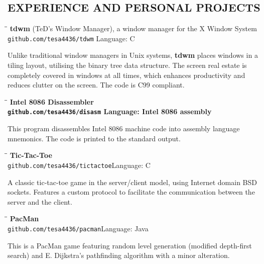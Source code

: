 \documentclass{res}
\begin{document}
\begin{resume}
\section{EXPERIENCE AND PERSONAL PROJECTS}
   \vspace{-0.1in}	
   \begin{tabbing}
   \hspace{2.3in}\= \hspace{2.97in}\= \kill %
    \textbf{tdwm} (TeD's Window Manager), a window manager for the X Window System\\
    \texttt{github.com/tesa4436/tdwm}\>     \>Language: C\\
   \end{tabbing}\vspace{-20pt}      %
   Unlike traditional window managers in Unix systems, \textbf{tdwm} places windows in a tiling layout,
   utilising the binary tree data structure. The screen real estate is completely covered in windows at
   all times, which enhances productivity and reduces clutter on the screen. The code is C99 compliant.
   \begin{tabbing}
   \hspace{2.3in}\= \hspace{1.9in}\= \kill %
    \bf Intel 8086 Disassembler\\
    \texttt{github.com/tesa4436/disasm} \> \>Language: Intel 8086 assembly\\
   \end{tabbing}\vspace{-20pt}
   This program disassembles Intel 8086 machine code into assembly language mnemonics.
   The code is printed to the standard output.
   \begin{tabbing}
   \hspace{2.3in}\= \hspace{2.97in}\= \kill %
   \textbf{Tic-Tac-Toe}\\
   \texttt{github.com/tesa4436/tictactoe}\>\>Language: C\\
   \end{tabbing}\vspace{-20pt}
   A classic tic-tac-toe game in the server/client model, using Internet domain BSD sockets. 
   Features a custom protocol to facilitate the communication between the server and the client.

   \begin{tabbing}
   \hspace{2.3in}\= \hspace{2.8in}\= \kill %
   \textbf{PacMan}\\
   \texttt{github.com/tesa4436/pacman}\>\>Language: Java\\
   \end{tabbing}\vspace{-20pt}
   This is a PacMan game featuring random level generation (modified depth-first search) and
   E. Dijkstra's pathfinding algorithm with a minor alteration.


\end{resume}
\end{document}
